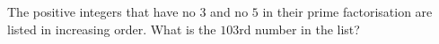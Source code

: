 The positive integers that have no $3$ and no $5$ in their prime factorisation are listed in increasing order. What is the $103$rd number in the list?
